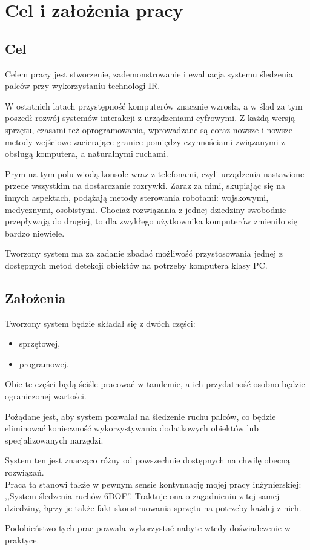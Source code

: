 \chapter{Cel i założenia pracy}\label{ch:purpose}

\section{Cel}

Celem pracy jest stworzenie, zademonstrowanie i ewaluacja systemu śledzenia palców przy wykorzystaniu technologi IR.

W ostatnich latach przystępność komputerów znacznie wzrosła, a w ślad za tym poszedł rozwój systemów interakcji z urządzeniami cyfrowymi. Z każdą wersją sprzętu, czasami też oprogramowania, wprowadzane są coraz nowsze i nowsze metody wejściowe zacierające granice pomiędzy czynnościami związanymi z obsługą komputera, a naturalnymi ruchami.

Prym na tym polu wiodą konsole wraz z telefonami, czyli urządzenia nastawione przede wszystkim na dostarczanie rozrywki. Zaraz za nimi, skupiając się na innych aspektach, podążają metody sterowania robotami: wojskowymi, medycznymi, osobistymi. Chociaż rozwiązania z jednej dziedziny swobodnie przepływają do drugiej, to dla zwykłego użytkownika komputerów zmieniło się bardzo niewiele.

Tworzony system ma za zadanie zbadać możliwość przystosowania jednej z dostępnych metod detekcji obiektów na potrzeby komputera klasy PC.\\

\section{Założenia}

Tworzony system będzie składał się z dwóch części:
\begin{itemize}
 \item sprzętowej,
 \item programowej.
\end{itemize}

Obie te części będą ściśle pracować w tandemie, a ich przydatność osobno będzie ograniczonej wartości.

Pożądane jest, aby system pozwalał na śledzenie ruchu palców, co będzie eliminować konieczność wykorzystywania dodatkowych obiektów lub specjalizowanych narzędzi.

System ten jest znacząco różny od powszechnie dostępnych na chwilę obecną rozwiązań.\\

Praca ta stanowi także w pewnym sensie kontynuację mojej pracy inżynierskiej: ,,System śledzenia ruchów 6DOF''.
Traktuje ona o zagadnieniu z tej samej dziedziny, łączy je także fakt skonstruowania sprzętu na potrzeby każdej z nich.

Podobieństwo tych prac pozwala wykorzystać nabyte wtedy doświadczenie w praktyce.
